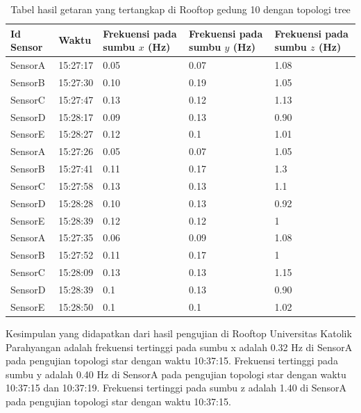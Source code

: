 \begin{itemize}
    \begin{table}[H]
	\centering
	\caption{Tabel hasil getaran yang tertangkap di Rooftop gedung 10 dengan topologi tree}
	\label{tree_paskal_tabel}
    	\begin{tabular}{|p{2cm}|p{2cm}|p{3cm}|p{3cm}|p{3cm}|}
    		\hline 
    		Id Sensor & Waktu & Frekuensi pada sumbu $x$ (Hz) & Frekuensi pada sumbu $y$ (Hz) & Frekuensi pada sumbu $z$ (Hz) \\
    		\hline
    		SensorA & 15:27:17 & 0.05 & 0.07 & 1.08 \\
    		\hline
    		SensorB & 15:27:30 & 0.10 & 0.19 & 1.05 \\
    		\hline
    		SensorC & 15:27:47 & 0.13 & 0.12 & 1.13 \\
    		\hline
    		SensorD & 15:28:17 & 0.09 & 0.13 & 0.90 \\
    		\hline
    		SensorE & 15:28:27 & 0.12 & 0.1 & 1.01 \\
    		\hline
    		SensorA & 15:27:26 & 0.05 & 0.07 & 1.05 \\
    		\hline
    		SensorB & 15:27:41 & 0.11 & 0.17 & 1.3 \\
    		\hline
    		SensorC & 15:27:58 & 0.13 & 0.13 & 1.1 \\
    		\hline
    		SensorD & 15:28:28 & 0.10 & 0.13 & 0.92 \\
    		\hline
    		SensorE & 15:28:39 & 0.12 & 0.12 & 1 \\
    		\hline
    		SensorA & 15:27:35 & 0.06 & 0.09 & 1.08 \\
    		\hline
    		SensorB & 15:27:52 & 0.11 & 0.17 & 1 \\
    		\hline
    		SensorC & 15:28:09 & 0.13 & 0.13 & 1.15 \\
    		\hline
    		SensorD & 15:28:39 & 0.1 & 0.13 & 0.90 \\
    		\hline
    		SensorE & 15:28:50 & 0.1 & 0.1 & 1.02 \\
    		\hline
    	\end{tabular}
    \end{table}
\end{itemize}

Kesimpulan yang didapatkan dari hasil pengujian di Rooftop Universitas Katolik Parahyangan adalah frekuensi tertinggi pada sumbu x adalah 0.32 Hz di SensorA pada pengujian topologi star dengan waktu 10:37:15. Frekuensi tertinggi pada sumbu y adalah 0.40 Hz di SensorA pada pengujian topologi star dengan waktu 10:37:15 dan 10:37:19. Frekuensi tertinggi pada sumbu z adalah 1.40 di SensorA pada pengujian topologi star dengan waktu 10:37:15.

